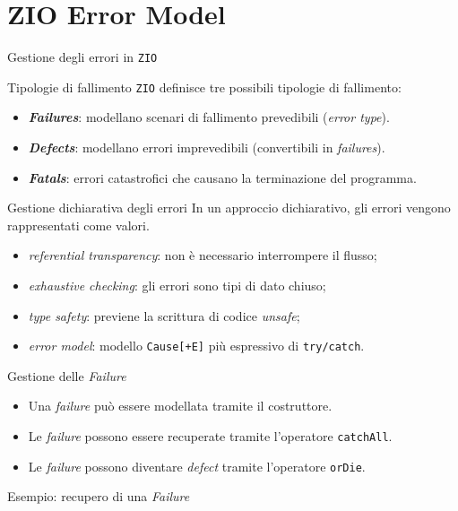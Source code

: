 \section{ZIO Error Model}

\begin{frame}{Gestione degli errori in \texttt{ZIO}}

  \begin{block}{Tipologie di fallimento}
    \texttt{ZIO} definisce tre possibili tipologie di fallimento:
    \begin{itemize}
      \item \textbf{\textit{Failures}}: modellano scenari di fallimento prevedibili (\textit{error type}).
      \item \textbf{\textit{Defects}}: modellano errori imprevedibili (convertibili in \textit{failures}).
      \item \textbf{\textit{Fatals}}: errori catastrofici che causano la terminazione del programma.
    \end{itemize}
  \end{block}

  \begin{block}{Gestione dichiarativa degli errori}
    In un approccio dichiarativo, gli errori vengono rappresentati come valori.
    \begin{itemize}
      \item \textit{referential transparency}: non è necessario interrompere il flusso; 
      \item \textit{exhaustive checking}: gli errori sono tipi di dato chiuso;
      \item \textit{type safety}: previene la scrittura di codice \textit{unsafe};
      \item \textit{error model}: modello \texttt{Cause[+E]} più espressivo di \texttt{try/catch}.
    \end{itemize}
  \end{block}
\end{frame}

\begin{frame}
  \begin{block}{Gestione delle \textit{Failure}}
    \begin{itemize}
      \item Una \textit{failure} può essere modellata tramite il costruttore.
      \item Le \textit{failure} possono essere recuperate tramite l'operatore \texttt{catchAll}.
      \item Le \textit{failure} possono diventare \textit{defect} tramite l'operatore \texttt{orDie}.
    \end{itemize}
  \end{block}

  \begin{block}{Esempio: recupero di una \textit{Failure}}
    
  \end{block}
\end{frame}